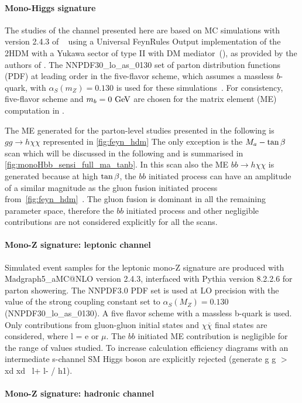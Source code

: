 \paragraph{Mono-Higgs signature}

The studies of the \monohbb channel presented here are based on MC simulations with version 2.4.3 of \mg~\cite{Alwall:2014hca} using a Universal FeynRules Output \cite{Degrande:2011ua} implementation of the 2HDM with a Yukawa sector of type II with DM mediator~(\hdma), as provided by the authors of \cite{Bauer:2017ota}. 
The NNPDF30\_lo\_as\_0130 set of parton distribution functions (PDF) at leading order in the five-flavor scheme, which assumes a massless $b$-quark, with $\alpha_{S}(m_{Z}) = 0.130$ is used for these simulations~\cite{Ball:2014uwa}. For consistency, five-flavor scheme and $m_b=0~\textrm{GeV}$ are chosen for the matrix element (ME) computation in \mg.

The ME generated for the parton-level studies presented in the following is $ g g \to h  \chi \chi$ represented in  \autoref{fig:feyn_hdm}
The only exception is the $M_{a}-\tan\beta$ scan which will be discussed in the following and is summarised in \autoref{fig:monoHbb_sensi_full_ma_tanb}. In this scan also the ME $b b \to h  \chi \chi$ is generated because at high $\tan\beta$, the $b b$ initiated process can have an amplitude of a similar magnitude as the gluon fusion initiated process from~\autoref{fig:feyn_hdm}~\cite{Bauer:2017ota}. 
The gluon fusion is dominant in all the remaining parameter space, therefore the $bb$ initiated process and other negligible contributions are not considered explicitly for all the scans.

\paragraph{Mono-Z signature: leptonic channel}

Simulated event samples for the leptonic mono-Z signature are produced with Madgraph5\_aMC@NLO version 2.4.3, interfaced with Pythia version 8.2.2.6 for parton showering. The NNPDF3.0 PDF set is used at LO precision with the value of the strong coupling constant set to $\alpha_{S}(M_{Z}) = 0.130$ (NNPDF30\_lo\_as\_0130). A five flavor scheme with a massless b-quark is used.  Only contributions from gluon-gluon initial states and \lp\lm$\chi\overline{\chi}$ final states are considered, where l = e or $\mu$.  The $bb$ initiated ME contribution is negligible for the range of \tanb values studied.  To increase calculation efficiency diagrams with an intermediate s-channel SM Higgs boson are explicitly rejected (generate g g $>$ xd xd~ l+ l- / h1).

\paragraph{Mono-Z signature: hadronic channel}
